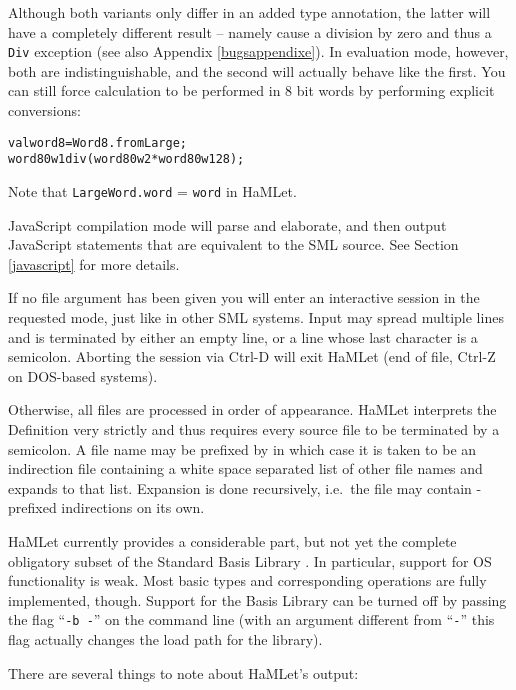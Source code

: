 \documentclass[twoside,titlepage]{article}
\begin{document}
Although both variants only differ in an added type annotation, the latter will have a completely different result -- namely cause a division by zero and thus a {\tt Div} exception (see also Appendix \ref{bugsappendixe}). In evaluation mode, however, both are indistinguishable, and the second will actually behave like the first. You can still force calculation to be performed in 8 bit words by performing explicit conversions:

\begin{quoting}
\begin{alltt}
val word8 = Word8.fromLarge;
word8 0w1 div (word8 0w2 * word8 0w128);
\end{alltt}
\end{quoting}

Note that {\tt LargeWord.word} = {\tt word} in HaMLet.

JavaScript compilation mode will parse and elaborate, and then output JavaScript statements that are equivalent to the SML source. See Section \ref{javascript} for more details.

If no file argument has been given you will enter an interactive session in the requested mode, just like in other SML systems. Input may spread multiple lines and is terminated by either an empty line, or a line whose last character is a semicolon. Aborting the session via Ctrl-D will exit HaMLet (end of file, Ctrl-Z on DOS-based systems).

Otherwise, all files are processed in order of appearance. HaMLet interprets the Definition very strictly and thus requires every source file to be terminated by a semicolon. A file name may be prefixed by {\tt@} in which case it is taken to be an indirection file containing a white space separated list of other file names and expands to that list. Expansion is done recursively, i.e.\ the file may contain {\tt@}-prefixed indirections on its own.

HaMLet currently provides a considerable part, but not yet the complete obligatory subset of the Standard Basis Library \cite{basis}. In particular, support for OS functionality is weak. Most basic types and corresponding operations are fully implemented, though. Support for the Basis Library can be turned off by passing the flag ``{\tt -b -}'' on the command line (with an argument different from ``{\tt -}'' this flag actually changes the load path for the library).

There are several things to note about HaMLet's output:
\end{document}
